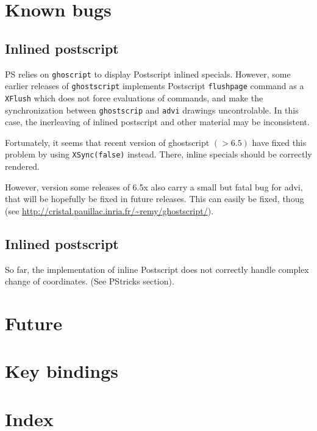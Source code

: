 \documentclass[12pt]{article}
\begin{document}
\medskip \noindent
\docdef \setkeys{}




\appendix


\section {Known bugs}

\subsection*{Inlined postscript}

PS relies on {\tt ghoscript} to display Postscript inlined specials.
However, some earlier releases of {\tt ghostscript} 
implements Postscript {\tt flushpage} command as a {\tt XFlush} 
which does not force evaluations of commands, and make the 
synchronization between {\tt ghostscrip} and {\tt advi} drawings 
uncontrolable. In this case, the inerleaving of inlined postscript 
and other material may be inconsistent. 

Fortunately, it seems that recent version of ghostscript $(> 6.5)$ have
fixed this problem by using {\tt XSync(false)} instead.
There, inline specials should be correctly rendered. 

However, version some releases of 6.5x also carry a small but fatal bug for
advi, that will be hopefully be fixed in future releases. This can easily be
fixed, thoug (see \url{http://cristal.pauillac.inria.fr/~remy/ghostscript/}).

\subsection*{Inlined postscript}

So far, the implementation of inline Postscript does not correctly handle
complex change of coordinates.  (See PStricks section). 


\section {Future}

\section {Key bindings}

\section {Index}

\printindex
\end{document}
